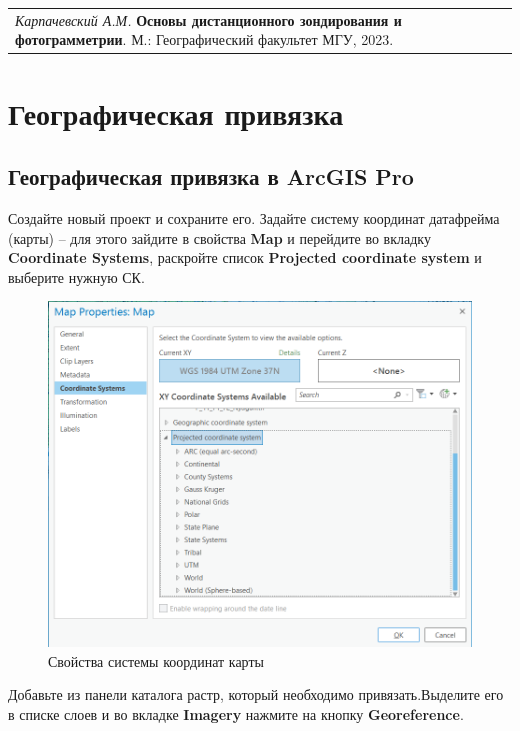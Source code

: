 \documentclass[
  12pt,
]{book}
\begin{document}
\begin{longtable}[]{@{}l@{}}
\toprule\noalign{}
\endhead
\bottomrule\noalign{}
\endlastfoot
\emph{Карпачевский А.М.} \textbf{Основы дистанционного зондирования и фотограмметрии}. М.: Географический факультет МГУ, 2023. \\
\end{longtable}

\hypertarget{georeference}{%
\chapter{Географическая привязка}\label{georeference}}

\hypertarget{georeference-arcgis}{%
\section{Географическая привязка в ArcGIS Pro}\label{georeference-arcgis}}

Создайте новый проект и сохраните его. Задайте систему координат датафрейма (карты) -- для этого зайдите в свойства \textbf{Map} и перейдите во вкладку \textbf{Coordinate Systems}, раскройте список \textbf{Projected coordinate system} и выберите нужную СК.

\begin{figure}
\centering
\includegraphics{images/Ref02/Arc_mapCRS.png}
\caption{Свойства системы координат карты}
\end{figure}

Добавьте из панели каталога растр, который необходимо привязать.Выделите его в списке слоев и во вкладке \textbf{Imagery} нажмите на кнопку \textbf{Georeference}.
\end{document}
